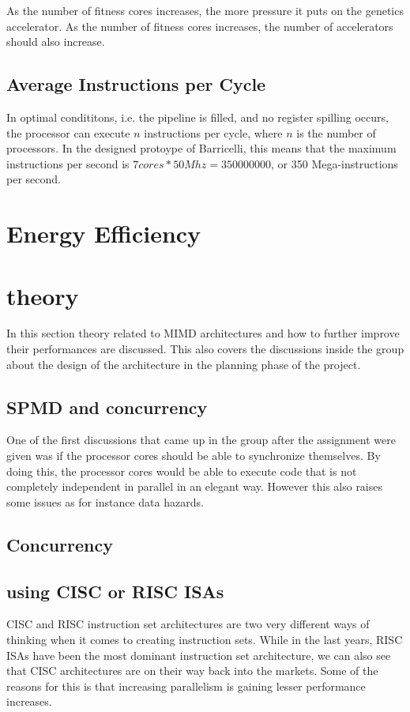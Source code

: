 As the number of fitness cores increases, the more pressure it puts on the genetics accelerator.
As the number of fitness cores increases, the number of accelerators should also increase.

\subsection{Average Instructions per Cycle}

In optimal condititons, i.e.
the pipeline is filled, and no register spilling occurs, the processor can execute $ n $ instructions per cycle, where $ n $ is the number of processors.
In the designed protoype of Barricelli, this means that the maximum instructions per second is $ 7 cores * 50Mhz = 350 000 000 $, or 350 Mega-instructions per second.

\section{Energy Efficiency}

\section{theory}
In this section theory related to MIMD architectures and how to further improve their performances are discussed.
This also covers the discussions inside the group about the design of the architecture in the planning phase of the project.
\subsection{SPMD and concurrency}
One of the first discussions that came up in the group after the assignment were given was if the processor cores should
be able to synchronize themselves.
By doing this, the processor cores would be able to execute code that is not completely independent in parallel in an elegant way.
However this also raises some issues as for instance data hazards.


\subsection{Concurrency} 




\subsection{using CISC or RISC ISAs}
CISC and RISC instruction set architectures are two very different ways of thinking when it comes to creating instruction sets.
While in the last years, RISC ISAs have been the most dominant instruction set architecture, we can also see that CISC architectures
are on their way back into the markets.
Some of the reasons for this is that increasing parallelism is gaining lesser performance increases.

